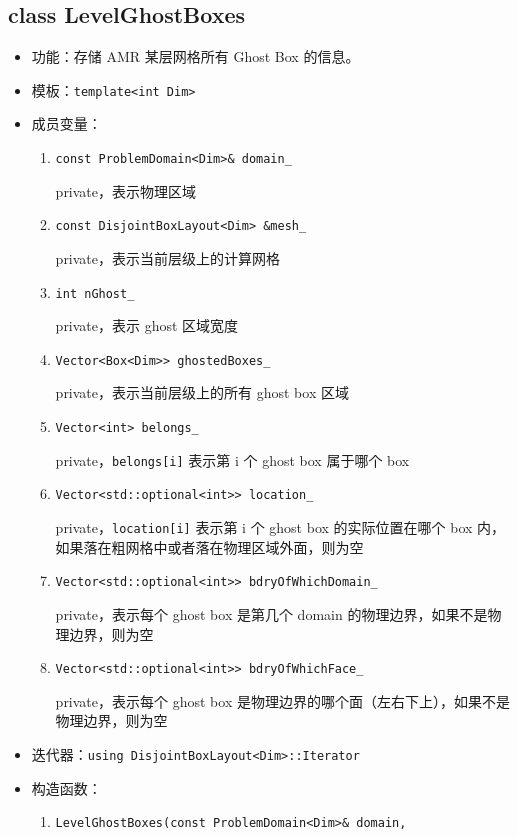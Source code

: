 \documentclass[cn, bibend=bibtex]{elegantpaper}
\theoremstyle{plain}
\begin{document}
\subsection{class LevelGhostBoxes}

\begin{itemize}
  \item 功能：存储 AMR 某层网格所有 Ghost Box 的信息。
  \item 模板：\lstinline|template<int Dim>|
  \item 成员变量：
  \begin{enumerate}
    \item \lstinline|const ProblemDomain<Dim>& domain_|

    private，表示物理区域
    \item \lstinline|const DisjointBoxLayout<Dim> &mesh_|

    private，表示当前层级上的计算网格

    \item \lstinline|int nGhost_|

    private，表示 ghost 区域宽度
    \item \lstinline|Vector<Box<Dim>> ghostedBoxes_|

    private，表示当前层级上的所有 ghost box 区域
    \item \lstinline|Vector<int> belongs_|

    private，\verb|belongs[i]| 表示第 i 个 ghost box 属于哪个 box
    \item \lstinline|Vector<std::optional<int>> location_|

    private，\verb|location[i]| 表示第 i 个 ghost box 的实际位置在哪个 box 内，如果落在粗网格中或者落在物理区域外面，则为空

    \item \lstinline|Vector<std::optional<int>> bdryOfWhichDomain_|

    private，表示每个 ghost box 是第几个 domain 的物理边界，如果不是物理边界，则为空

    \item \lstinline|Vector<std::optional<int>> bdryOfWhichFace_|

    private，表示每个 ghost box 是物理边界的哪个面（左右下上），如果不是物理边界，则为空
  \end{enumerate}
  \item 迭代器：\lstinline|using DisjointBoxLayout<Dim>::Iterator|
  \item 构造函数：
  \begin{enumerate}
    \item \lstinline|LevelGhostBoxes(const ProblemDomain<Dim>& domain,|
    

\end{enumerate}
\end{itemize}
\end{document}
